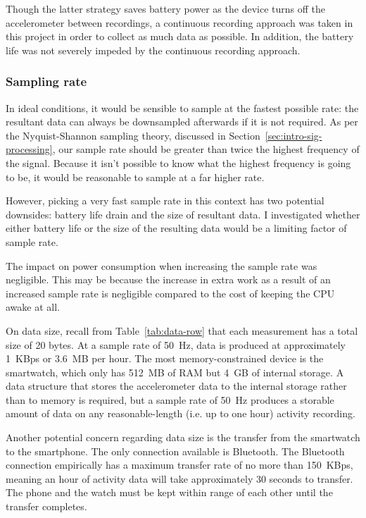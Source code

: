         Though the latter strategy saves battery power as the device turns off the accelerometer between recordings, a continuous recording approach was taken in this project in order to collect as much data as possible. In addition, the battery life was not severely impeded by the continuous recording approach.
        
      \subsubsection{Sampling rate}
        In ideal conditions, it would be sensible to sample at the fastest possible rate: the resultant data can always be downsampled afterwards if it is not required. As per the Nyquist-Shannon sampling theory, discussed in Section~\ref{sec:intro-sig-processing}, our sample rate should be greater than twice the highest frequency of the signal. Because it isn't possible to know what the highest frequency is going to be, it would be reasonable to sample at a far higher rate. 
        
        However, picking a very fast sample rate in this context has two potential downsides: battery life drain and the size of resultant data. I investigated whether either battery life or the size of the resulting data would be a limiting factor of sample rate.
        
        The impact on power consumption when increasing the sample rate was negligible. This may be because the increase in extra work as a result of an increased sample rate is negligible compared to the cost of keeping the CPU awake at all.
      
        On data size, recall from Table~\ref{tab:data-row} that each measurement has a total size of 20 bytes. At a sample rate of 50~\si{Hz}, data is produced at approximately 1~KBps or 3.6~MB per hour. The most memory-constrained device is the smartwatch, which only has 512~MB of RAM but 4~GB of internal storage. A data structure that stores the accelerometer data to the internal storage rather than to memory is required, but a sample rate of 50~\si{Hz} produces a storable amount of data on any reasonable-length (i.e. up to one hour) activity recording.
        
        Another potential concern regarding data size is the transfer from the smartwatch to the smartphone. The only connection available is Bluetooth. The Bluetooth connection empirically has a maximum transfer rate of no more than 150~KBps, meaning an hour of activity data will take approximately 30 seconds to transfer. The phone and the watch must be kept within range of each other until the transfer completes. 

